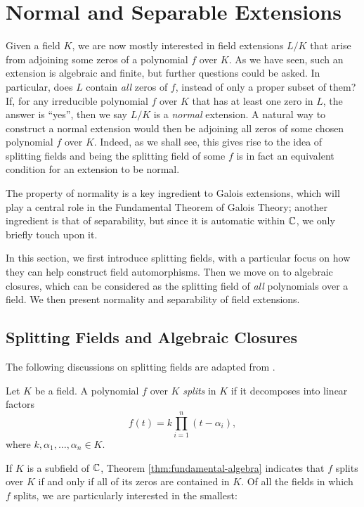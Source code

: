 \section{Normal and Separable Extensions}

Given a field $K$, we are now mostly interested in field extensions $L/K$ that arise from adjoining some zeros of a polynomial $f$ over $K$. As we have seen, such an extension is algebraic and finite, but further questions could be asked. In particular, does $L$ contain \textit{all} zeros of $f$, instead of only a proper subset of them? If,  for any irreducible polynomial $f$ over $K$ that has at least one zero in $L$, the answer is ``yes'', then we say $L/K$ is a \textit{normal} extension. 
A natural way to construct a normal extension would then be adjoining all zeros of some chosen polynomial $f$ over $K$. Indeed, as we shall see, this gives rise to the idea of splitting fields and being the splitting field of some $f$ is in fact an equivalent condition for an extension to be normal. 

The property of normality is a key ingredient to Galois extensions, which will play a central role in the Fundamental Theorem of Galois Theory; another ingredient is that of separability, but since it is automatic within $\mathbb C$, we only briefly touch upon it. 

In this section, we first introduce splitting fields, with a particular focus on how they can help construct field automorphisms. Then we move on to algebraic closures, which can be considered as the splitting field of \textit{all} polynomials over a field. We then present normality and separability of field extensions. 




\subsection{Splitting Fields and Algebraic Closures}
The following discussions on splitting fields are adapted from \cite{Stewart}. 
\begin{definition}
    Let $K$ be a field. A polynomial $f$ over $K$ \textit{splits} in $K$ if it decomposes into linear factors $$
    f(t) = k \prod _{i=1} ^n (t - \alpha_i),
    $$
    where $k, \alpha_1, \ldots, \alpha_n \in K$. 
\end{definition}
If $K$ is a subfield of $\mathbb C$, Theorem \ref{thm:fundamental-algebra} indicates that $f$ splits over $K$ if and only if all of its zeros are contained in $K$. 
Of all the fields in which $f$ splits, we are particularly interested in the smallest:

